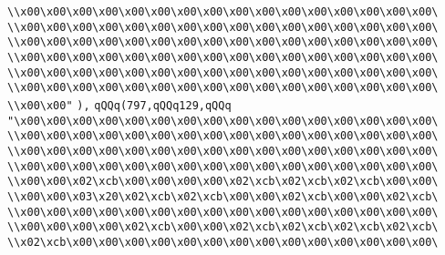 \verb|\\x00\x00\x00\x00\x00\x00\x00\x00\x00\x00\x00\x00\x00\x00\x00\x00\|\newline
\verb|\\x00\x00\x00\x00\x00\x00\x00\x00\x00\x00\x00\x00\x00\x00\x00\x00\|\newline
\verb|\\x00\x00\x00\x00\x00\x00\x00\x00\x00\x00\x00\x00\x00\x00\x00\x00\|\newline
\verb|\\x00\x00\x00\x00\x00\x00\x00\x00\x00\x00\x00\x00\x00\x00\x00\x00\|\newline
\verb|\\x00\x00\x00\x00\x00\x00\x00\x00\x00\x00\x00\x00\x00\x00\x00\x00\|\newline
\verb|\\x00\x00\x00\x00\x00\x00\x00\x00\x00\x00\x00\x00\x00\x00\x00\x00\|\newline
\verb|\\x00\x00"|\newline
\verb|),|\newline
\verb|qQQq(797,qQQq129,qQQq|\newline
\verb|"\x00\x00\x00\x00\x00\x00\x00\x00\x00\x00\x00\x00\x00\x00\x00\x00\|\newline
\verb|\\x00\x00\x00\x00\x00\x00\x00\x00\x00\x00\x00\x00\x00\x00\x00\x00\|\newline
\verb|\\x00\x00\x00\x00\x00\x00\x00\x00\x00\x00\x00\x00\x00\x00\x00\x00\|\newline
\verb|\\x00\x00\x00\x00\x00\x00\x00\x00\x00\x00\x00\x00\x00\x00\x00\x00\|\newline
\verb|\\x00\x00\x02\xcb\x00\x00\x00\x00\x02\xcb\x02\xcb\x02\xcb\x00\x00\|\newline
\verb|\\x00\x00\x03\x20\x02\xcb\x02\xcb\x00\x00\x02\xcb\x00\x00\x02\xcb\|\newline
\verb|\\x00\x00\x00\x00\x00\x00\x00\x00\x00\x00\x00\x00\x00\x00\x00\x00\|\newline
\verb|\\x00\x00\x00\x00\x02\xcb\x00\x00\x02\xcb\x02\xcb\x02\xcb\x02\xcb\|\newline
\verb|\\x02\xcb\x00\x00\x00\x00\x00\x00\x00\x00\x00\x00\x00\x00\x00\x00\|\newline

